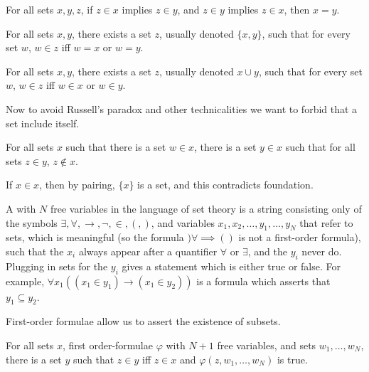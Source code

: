 \begin{axiom}[extensionality]
For all sets $x, y, z$, if $z \in x$ implies $z \in y$, and $z \in y$ implies $z \in x$, then $x = y$.
\end{axiom}
\begin{axiom}[pairing]
For all sets $x, y$, there exists a set $z$, usually denoted $\{x, y\}$, such that for every set $w$, $w \in z$ iff $w = x$ or $w = y$.
\end{axiom}
\begin{axiom}[union]
For all sets $x, y$, there exists a set $z$, usually denoted $x \cup y$, such that for every set $w$, $w \in z$ iff $w \in x$ or $w \in y$.
\end{axiom}

\begin{subsec}
Now to avoid Russell's paradox and other technicalities we want to forbid that a set include itself.
\end{subsec}

\begin{axiom}[foundation]
For all sets $x$ such that there is a set $w \in x$, there is a set $y \in x$ such that for all sets $z \in y$, $z \notin x$.
\end{axiom}

\begin{subsec}
If $x \in x$, then by pairing, $\{x\}$ is a set, and this contradicts foundation.
\end{subsec}

\begin{subsec}
A  with $N$ free variables in the language of set theory is a string consisting only of the symbols $\exists,\forall,\to,\neg,\in,(,)$, and variables $x_{1},x_{2},\ldots, y_{1},\ldots,y_{N}$ that refer to sets, which is meaningful (so the formula $)\forall \implies()$ is not a first-order formula), such that the $x_{i}$ always appear after a quantifier $\forall$ or $\exists$, and the $y_{i}$ never do.
Plugging in sets for the $y_{i}$ gives a statement which is either true or false.
For example, $\forall x_{1}((x_{1} \in y_{1}) \to (x_{1} \in y_{2}))$ is a formula which asserts that $y_{1} \subseteq y_{2}$.
\end{subsec}

\begin{subsec}
First-order formulae allow us to assert the existence of subsets.
\end{subsec}

\begin{axiom}
For all sets $x$, first order-formulae $\varphi$ with $N+1$ free variables, and sets $w_{1}, \dots, w_{N}$, there is a set $y$ such that $z \in y$ iff $z \in x$ and $\varphi(z, w_{1}, \dots, w_{N})$ is true.
\end{axiom}

